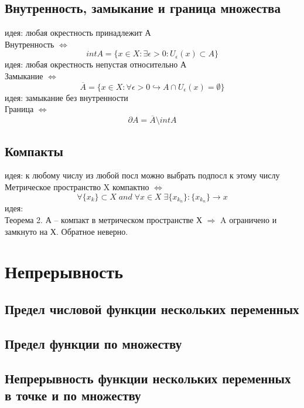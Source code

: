 \documentclass{article}
\begin{document}
\subsection{Внутренность, замыкание и граница множества}
идея: любая окрестность принадлежит А \\
Внутренность $\Leftrightarrow$
\begin{equation*}
    int A = \{ x \in X: \exists \epsilon > 0: U_{\epsilon} (x) \subset A \}
\end{equation*}
идея: любая окрестность непустая относительно А \\
Замыкание $\Leftrightarrow$
\begin{equation*}
    \overline{A} = \{ x \in X: \forall \epsilon>0 \hookrightarrow A \cap U_\epsilon (x) = \emptyset \}
\end{equation*}
идея: замыкание без внутренности \\
Граница $\Leftrightarrow$
\begin{equation*}
    \partial A = \overline{A} \setminus int A
\end{equation*}
\subsection{Компакты}
идея: к любому числу из любой посл можно выбрать подпосл к этому числу \\
Метрическое пространство X компактно $\Leftrightarrow$
\begin{equation*}
    \forall \{ x_k \} \subset X \; and \; \forall x \in X \; \exists \{ x_{k_n} \}: \{ x_{k_n} \} \rightarrow x
\end{equation*}
идея: \\
Теорема 2. А -- компакт в метрическом пространстве Х $\Rightarrow$ A ограничено и замкнуто на Х. Обратное неверно.

\section{Непрерывность}
\subsection{Предел числовой функции нескольких переменных}
\subsection{Предел функции по множеству}
\subsection{Непрерывность функции нескольких переменных в точке и по множеству}
\end{document}
